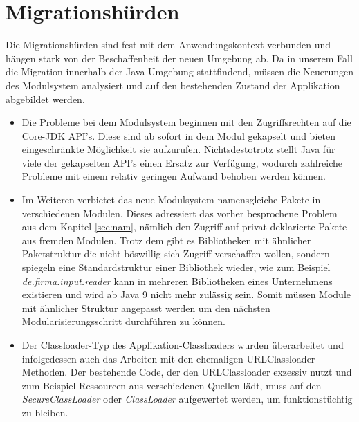 \section{Migrationshürden} \label{MigH}

	Die Migrationshürden sind fest mit dem Anwendungskontext verbunden und hängen stark von der Beschaffenheit der neuen Umgebung ab. Da in unserem Fall die Migration innerhalb der Java Umgebung stattfindend, müssen die Neuerungen des Modulsystem analysiert und auf den bestehenden Zustand der Applikation abgebildet werden.\bigbreak

\begin{itemize}
	\item Die Probleme bei dem Modulsystem beginnen mit den Zugriffsrechten auf die Core-JDK API's. Diese sind ab sofort in dem Modul gekapselt und bieten eingeschränkte Möglichkeit sie aufzurufen. Nichtsdestotrotz stellt Java für viele der gekapselten API's einen Ersatz zur Verfügung, wodurch zahlreiche Probleme mit einem relativ geringen Aufwand behoben werden können. \cite{masteringJava9,modulProgJava9,modulMitJava9,javaMod9} 


	\item Im Weiteren verbietet das neue Modulsystem namensgleiche Pakete in verschiedenen Modulen. Dieses adressiert das vorher besprochene Problem aus dem Kapitel \ref{sec:nam}, nämlich den Zugriff auf privat deklarierte Pakete aus fremden Modulen. Trotz dem gibt es Bibliotheken mit ähnlicher Paketstruktur die nicht böswillig sich Zugriff verschaffen wollen, sondern spiegeln eine Standardstruktur einer Bibliothek wieder, wie zum Beispiel \textit{de.firma.input.reader} kann in mehreren Bibliotheken eines Unternehmens existieren und wird ab Java 9 nicht mehr zulässig sein. Somit müssen Module mit ähnlicher Struktur angepasst werden um den nächsten Modularisierungsschritt durchführen zu können. \cite{masteringJava9,modulProgJava9,modulMitJava9,javaMod9} 


	\item Der Classloader-Typ des Applikation-Classloaders wurden überarbeitet und infolgedessen auch das Arbeiten mit den ehemaligen URLClassloader Methoden. Der bestehende Code, der den URLClassloader exzessiv nutzt und zum Beispiel Ressourcen aus verschiedenen Quellen lädt, muss auf den \textit{SecureClassLoader} oder  \textit{ClassLoader} aufgewertet werden, um funktionstüchtig zu bleiben. \cite{oracModClassLoader} 



\end{itemize}
